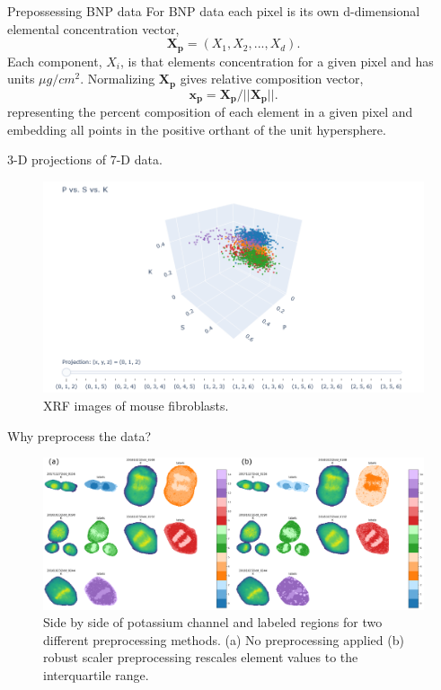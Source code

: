 \documentclass[
]{beamer}
\begin{document}
\begin{frame}{Prepossessing BNP data}
For BNP data each pixel is its own d-dimensional elemental concentration vector, 
$$\boldsymbol{X_p} = (X_1, X_2, ..., X_d).$$
Each component, $X_i$, is that elements concentration for a given pixel and has units $\mu g/cm^2$. Normalizing $\boldsymbol{X_p}$ gives relative composition vector,
$$ \boldsymbol{x_p} = \boldsymbol{X_p}/||\boldsymbol{X_p}||.$$
representing the percent composition of each element in a given pixel and embedding all points in the positive orthant of the unit hypersphere. 
\end{frame}

\begin{frame}{3-D projections of 7-D data.}
\begin{figure}[h]
  \includegraphics[width=1\textwidth,height=1\textheight,keepaspectratio]{7dto3d.png}
  \caption{XRF images of mouse fibroblasts.}
\end{figure}
\end{frame}

\begin{frame}{Why preprocess the data?}
\begin{figure}[h]
  \includegraphics[width=1\textwidth,height=.7\textheight,keepaspectratio]{labels_compare_preprocessing.png}
  \caption{Side by side of potassium channel and labeled regions for two different preprocessing methods. (a) No preprocessing applied (b) robust scaler preprocessing rescales element values to the interquartile range.}
\end{figure}
\end{frame}
\end{document}
